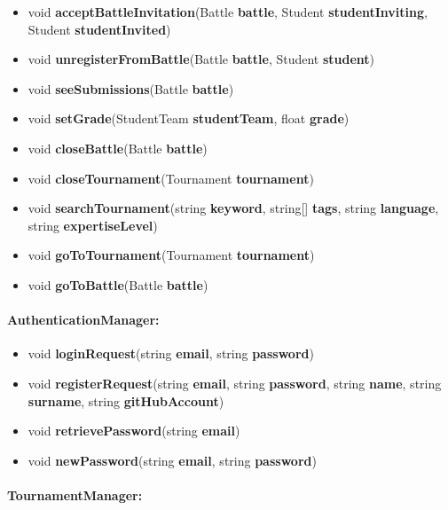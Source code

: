 \documentclass{article}
\begin{document}
\begin{itemize}
    \item void \textbf{acceptBattleInvitation}(Battle \textbf{battle}, Student \textbf{studentInviting}, Student \textbf{studentInvited})
    \item void \textbf{unregisterFromBattle}(Battle \textbf{battle}, Student \textbf{student})
    \item void \textbf{seeSubmissions}(Battle \textbf{battle})
    \item void \textbf{setGrade}(StudentTeam \textbf{studentTeam}, float \textbf{grade})
    \item void \textbf{closeBattle}(Battle \textbf{battle})
    \item void \textbf{closeTournament}(Tournament \textbf{tournament})
    \item void \textbf{searchTournament}(string \textbf{keyword}, string[] \textbf{tags}, string \textbf{language}, string \textbf{expertiseLevel})
    \item void \textbf{goToTournament}(Tournament \textbf{tournament})
    \item void \textbf{goToBattle}(Battle \textbf{battle})
\end{itemize}

\paragraph{AuthenticationManager:}

\begin{itemize}
    \item void \textbf{loginRequest}(string \textbf{email}, string \textbf{password})
    \item void \textbf{registerRequest}(string \textbf{email}, string \textbf{password}, string \textbf{name}, string \textbf{surname}, string \textbf{gitHubAccount})
    \item void \textbf{retrievePassword}(string \textbf{email})
    \item void \textbf{newPassword}(string \textbf{email}, string \textbf{password})

\end{itemize}

\paragraph{TournamentManager:}
\end{document}
